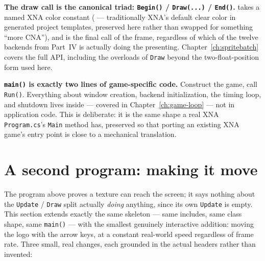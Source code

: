 \textbf{The draw call is the canonical  triad:
\texttt{Begin()} / \texttt{Draw(...)} / \texttt{End()}.}  takes a
named XNA color constant ( --- traditionally XNA's default
clear color in generated project templates, preserved here rather than swapped for something
``more CNA''), and  is the final call of the frame,
regardless of which of the twelve backends from Part~IV is actually doing the presenting.
Chapter~\ref{ch:spritebatch} covers the full  API, including the
overloads of \texttt{Draw} beyond the two-float-position form used here.

\textbf{\texttt{main()} is exactly two lines of game-specific code.} Construct the game,
call \texttt{Run()}. Everything about window creation, backend initialization, the timing
loop, and shutdown lives inside  --- covered in
Chapter~\ref{ch:game-loop} --- not in application code. This is deliberate: it is the same
shape a real XNA \texttt{Program.cs}'s \texttt{Main} method has, preserved so that porting an
existing XNA game's entry point is close to a mechanical translation.

\section{A second program: making it move}
\label{sec:first-game-movement}

The program above proves a texture can reach the screen; it says nothing about the
\texttt{Update} / \texttt{Draw} split actually \emph{doing} anything, since its own
\texttt{Update} is empty. This section extends exactly the same skeleton --- same includes,
same class shape, same \texttt{main()} --- with the smallest genuinely interactive addition:
moving the logo with the arrow keys, at a constant real-world speed regardless of frame rate.
Three small, real changes, each grounded in the actual headers rather than invented:

